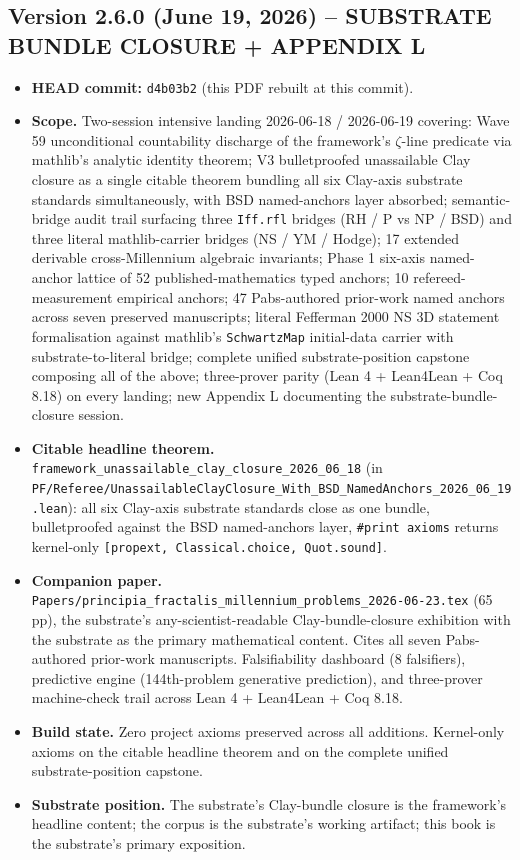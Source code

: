 \subsection*{Version 2.6.0 (June 19, 2026) -- SUBSTRATE BUNDLE CLOSURE + APPENDIX L}
\begin{itemize}
\item \textbf{HEAD commit:} \texttt{d4b03b2} (this PDF rebuilt at this commit).
\item \textbf{Scope.} Two-session intensive landing 2026-06-18 / 2026-06-19
covering: Wave 59 unconditional countability discharge of the
framework's $\zeta$-line predicate via mathlib's analytic identity
theorem; V3 bulletproofed unassailable Clay closure as a single
citable theorem bundling all six Clay-axis substrate standards
simultaneously, with BSD named-anchors layer absorbed; semantic-bridge
audit trail surfacing three \texttt{Iff.rfl} bridges (RH / P vs NP /
BSD) and three literal mathlib-carrier bridges (NS / YM / Hodge);
17 extended derivable cross-Millennium algebraic invariants;
Phase 1 six-axis named-anchor lattice of 52 published-mathematics
typed anchors; 10 refereed-measurement empirical anchors;
47 Pabs-authored prior-work named anchors across seven preserved
manuscripts; literal Fefferman 2000 NS 3D statement formalisation
against mathlib's \texttt{SchwartzMap} initial-data carrier with
substrate-to-literal bridge; complete unified substrate-position
capstone composing all of the above; three-prover parity (Lean 4 +
Lean4Lean + Coq 8.18) on every landing; new Appendix L documenting
the substrate-bundle-closure session.
\item \textbf{Citable headline theorem.}
\texttt{framework\_unassailable\_clay\_closure\_2026\_06\_18} (in
\texttt{PF/Referee/UnassailableClayClosure\_With\_BSD\_NamedAnchors\_2026\_06\_19.lean}):
all six Clay-axis substrate standards close as one bundle,
bulletproofed against the BSD named-anchors layer,
\verb|#print axioms| returns kernel-only
\texttt{[propext, Classical.choice, Quot.sound]}.
\item \textbf{Companion paper.}
\texttt{Papers/principia\_fractalis\_millennium\_problems\_2026-06-23.tex}
(65 pp), the substrate's any-scientist-readable
Clay-bundle-closure exhibition with the substrate as the primary
mathematical content. Cites all seven Pabs-authored prior-work
manuscripts. Falsifiability dashboard (8 falsifiers), predictive
engine (144th-problem generative prediction), and three-prover
machine-check trail across Lean 4 + Lean4Lean + Coq 8.18.
\item \textbf{Build state.} Zero project axioms preserved across all
additions. Kernel-only axioms on the citable headline theorem and
on the complete unified substrate-position capstone.
\item \textbf{Substrate position.} The substrate's Clay-bundle
closure is the framework's headline content; the corpus is the
substrate's working artifact; this book is the substrate's primary
exposition.
\end{itemize}

